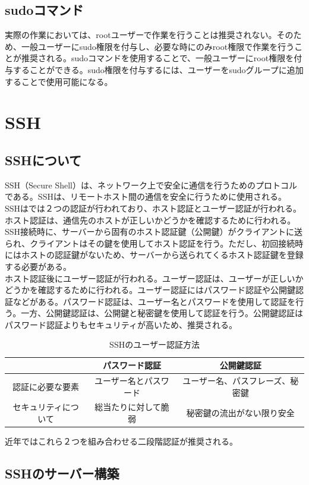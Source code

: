 \documentclass[a4paper, 11pt, dvipdfmx]{jsarticle}
\begin{document}
\subsection{sudoコマンド}
実際の作業においては、rootユーザーで作業を行うことは推奨されない。そのため、一般ユーザーにsudo権限を付与し、必要な時にのみroot権限で作業を行うことが推奨される。sudoコマンドを使用することで、一般ユーザーにroot権限を付与することができる。sudo権限を付与するには、ユーザーをsudoグループに追加することで使用可能になる。
\section{SSH}
\subsection{SSHについて}
SSH（Secure Shell）は、ネットワーク上で安全に通信を行うためのプロトコルである。SSHは、リモートホスト間の通信を安全に行うために使用される。\\
SSHはでは２つの認証が行われており、ホスト認証とユーザー認証が行われる。ホスト認証は、通信先のホストが正しいかどうかを確認するために行われる。SSH接続時に、サーバーから固有のホスト認証鍵（公開鍵）がクライアントに送られ、クライアントはその鍵を使用してホスト認証を行う。ただし、初回接続時にはホストの認証鍵がないため、サーバーから送られてくるホスト認証鍵を登録する必要がある。\\
ホスト認証後にユーザー認証が行われる。ユーザー認証は、ユーザーが正しいかどうかを確認するために行われる。ユーザー認証にはパスワード認証や公開鍵認証などがある。パスワード認証は、ユーザー名とパスワードを使用して認証を行う。一方、公開鍵認証は、公開鍵と秘密鍵を使用して認証を行う。公開鍵認証はパスワード認証よりもセキュリティが高いため、推奨される。
\begin{table}[H]
  \centering
  \caption{SSHのユーザー認証方法}
  \begin{tabular}{|c|c|c|} \hline
      & パスワード認証 & 公開鍵認証 \\ \hline
    認証に必要な要素 & ユーザー名とパスワード & ユーザー名、パスフレーズ、秘密鍵 \\ \hline
    セキュリティについて  & 総当たりに対して脆弱 & 秘密鍵の流出がない限り安全 \\ \hline
  \end{tabular}
\end{table}
近年ではこれら２つを組み合わせる二段階認証が推奨される。
\subsection{SSHのサーバー構築}
\end{document}
